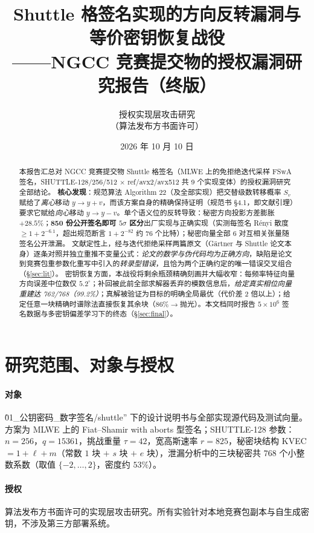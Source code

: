 \documentclass[11pt,a4paper]{ctexart}
\title{\bfseries Shuttle 格签名实现的方向反转漏洞与等价密钥恢复战役\\[2mm]
\large ——NGCC 竞赛提交物的授权漏洞研究报告（终版）}
\author{授权实现层攻击研究\\（算法发布方书面许可）}
\date{2026 年 10 月 10 日}
\begin{document}
\maketitle

\begin{abstract}
本报告汇总对 NGCC 竞赛提交物 Shuttle 格签名（MLWE 上的免拒绝迭代采样 FSwA 签名，SHUTTLE-128/256/512 $\times$ ref/avx2/avx512 共 9 个实现变体）的授权漏洞研究全部结论。
\textbf{核心发现}：规范算法 Algorithm 22（及全部实现）把交替级数转移概率 $S_v$ 赋给了\emph{离心}移动 $y\to y+v$，而该方案自身的精确保持证明（规范书 \S4.1，即文献\cite{shuttle}引理）要求它赋给\emph{向心}移动 $y\to y-v$。单个语义位的反转导致：秘密方向投影方差膨胀 $+28.5\%$；\textbf{850 份公开签名即可 $5\sigma$ 区分}出厂实现与正确实现（实测每签名 Rényi 散度 $\ge 1+2^{-6.1}$，超出规范断言 $1+2^{-82}$ 约 76 个比特）；秘密向量全部 $6$ 对互相关张量随签名公开泄漏。
文献定性上，经与迭代拒绝采样两篇原文（G\"artner\cite{gaertner} 与 Shuttle 论文\cite{shuttle}本身）逐条对照并独立重推不变量公式：\emph{论文的数学与伪代码均为正确方向}，缺陷是论文到竞赛包重参数化重写中引入的\emph{转录型错误}，且恰为两个正确约定的唯一错误交叉组合（\S\ref{sec:lit}）。
密钥恢复方面，本战役将剩余瓶颈精确刻画并大幅收窄：每频率特征向量方向误差中位数仅 $5.2^\circ$；补回被此前全部求解器丢弃的模数信息后，\emph{给定真实相位向量重建达 762/768（99.2\%）}；真解被验证为目标的明确全局最优（代价差 2 倍以上）；给定任意一块精确时谱除法直接恢复其余块（86\%$\to$抛光）。本文档同时报告 $5\times 10^6$ 签名数据与多密钥偏差学习下的终态（\S\ref{sec:final}）。
\end{abstract}

\tableofcontents

\section{研究范围、对象与授权}\label{sec:scope}

\paragraph{对象} \`01\_公钥密码\_数字签名/shuttle'' 下的设计说明书与全部实现源代码及测试向量。方案为 MLWE 上的 Fiat--Shamir with aborts 型签名；SHUTTLE-128 参数：$n=256$，$q=15361$，挑战重量 $\tau=42$，宽高斯速率 $r=825$，秘密块结构 KVEC $=1+\ell+m$（常数 $1$ 块 $+$ $s$ 块 $+$ $e$ 块），泄漏分析中的三块秘密共 $768$ 个小整数系数（取值 $\{-2,\dots,2\}$，密度约 $53\%$）。

\paragraph{授权} 算法发布方书面许可的实现层攻击研究。所有实验针对本地竞赛包副本与自生成密钥，不涉及第三方部署系统。
\end{document}
